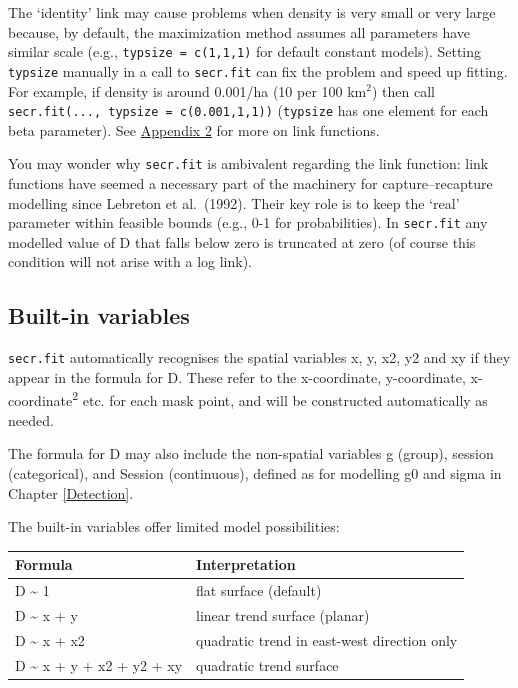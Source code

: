 \documentclass[
]{book}
\begin{document}
The `identity' link may cause problems when density is very small or very large because, by default, the maximization method assumes all parameters have similar scale (e.g., \texttt{typsize\ =\ c(1,1,1)} for default constant models). Setting \texttt{typsize} manually in a call to \texttt{secr.fit} can fix the problem and speed up fitting. For example, if density is around 0.001/ha (10 per 100 km\(^2\)) then call \texttt{secr.fit(...,\ typsize\ =\ c(0.001,1,1))} (\texttt{typsize} has one element for each beta parameter). See \hyperref[linkappendix]{Appendix 2} for more on link functions.

You may wonder why \texttt{secr.fit} is ambivalent regarding the link function: link functions have seemed a necessary part of the machinery for capture--recapture modelling since Lebreton et al.~(1992). Their key role is to keep the `real' parameter within feasible bounds (e.g., 0-1 for probabilities). In \texttt{secr.fit} any modelled value of D that falls below zero is truncated at zero (of course this condition will not arise with a log link).

\subsection{Built-in variables}\label{built-in-variables}

\texttt{secr.fit} automatically recognises the spatial variables x, y, x2, y2 and xy if they appear in the formula for D. These refer to the x-coordinate, y-coordinate, x-coordinate\textsuperscript{2} etc. for each mask point, and will be constructed automatically as needed.

The formula for D may also include the non-spatial variables g (group), session (categorical), and Session (continuous), defined as for modelling g0 and sigma in Chapter \ref{Detection}.

The built-in variables offer limited model possibilities:

\begin{longtable}[]{@{}ll@{}}
\toprule\noalign{}
Formula & Interpretation \\
\midrule\noalign{}
\endhead
\bottomrule\noalign{}
\endlastfoot
D \textasciitilde{} 1 & flat surface (default) \\
D \textasciitilde{} x + y & linear trend surface (planar) \\
D \textasciitilde{} x + x2 & quadratic trend in east-west direction only \\
D \textasciitilde{} x + y + x2 + y2 + xy & quadratic trend surface \\
\end{longtable}
\end{document}
